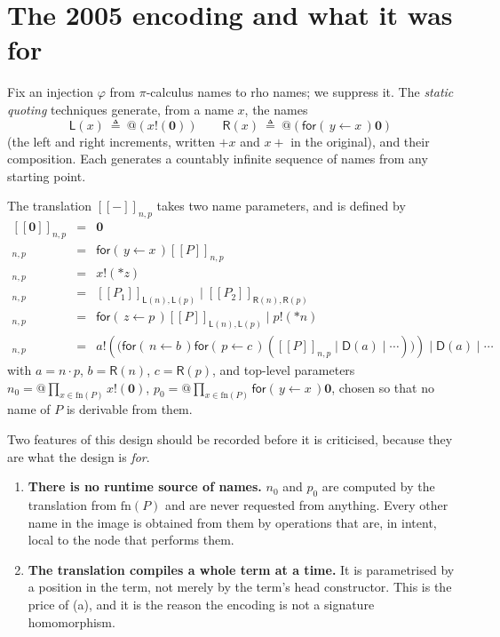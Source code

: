 \documentclass[11pt]{article}
\makeatletter
\theoremstyle{definition}
\theoremstyle{plain}
\theoremstyle{remark}
\newcommand{\quo}[1]{@#1}
\newcommand{\drp}[1]{{*}#1}
\newcommand{\inp}[3]{\mathsf{for}(\,#1 \leftarrow #2\,)#3}
\newcommand{\out}[2]{#1!(#2)}
\newcommand{\enc}[1]{[\![#1]\!]}
\newcommand{\nil}{\mathbf{0}}
\newcommand{\Lft}{\mathsf{L}}
\newcommand{\Rgt}{\mathsf{R}}
\newcommand{\Dup}{\mathsf{D}}
\newcommand{\fn}{\mathrm{fn}}
\makeatother
\begin{document}
\section{The 2005 encoding and what it was for}\label{sec:2005}

Fix an injection $\varphi$ from $\pi$-calculus names to rho names; we
suppress it. The \emph{static quoting} techniques generate, from a name
$x$, the names
\[
  \Lft(x) \ \triangleq\ \quo{(\out{x}{\nil})}
  \qquad
  \Rgt(x) \ \triangleq\ \quo{(\inp{y}{x}{\nil})}
\]
(the left and right increments, written $+x$ and $x{+}$ in the original),
and their composition. Each generates a countably infinite sequence of
names from any starting point.

The translation $\enc{-}_{n,p}$ takes two name parameters, and is defined
by
\[
\begin{array}{rcl}
\enc{\nil}_{n,p} &=& \nil \\
\enc{x(y).P}_{n,p} &=& \inp{y}{x}{\enc{P}_{n,p}} \\
\enc{\bar x \langle z\rangle}_{n,p} &=& \out{x}{\drp{z}} \\
\enc{P_1 \mid P_2}_{n,p} &=& \enc{P_1}_{\Lft(n),\Lft(p)} \mid \enc{P_2}_{\Rgt(n),\Rgt(p)} \\
\enc{(\nu z)P}_{n,p} &=& \inp{z}{p}{\enc{P}_{\Lft(n),\Lft(p)}} \mid \out{p}{\drp{n}} \\
\enc{!P}_{n,p} &=& \out{a}{\big(\inp{n}{b}{\inp{p}{c}{(\enc{P}_{n,p} \mid \Dup(a) \mid \cdots)}}\big)}
                   \mid \Dup(a) \mid \cdots
\end{array}
\]
with $a = n \cdot p$, $b = \Rgt(n)$, $c = \Rgt(p)$, and top-level
parameters $n_0 = \quo{\prod_{x \in \fn(P)} \out{x}{\nil}}$,
$p_0 = \quo{\prod_{x \in \fn(P)} \inp{y}{x}{\nil}}$, chosen so that no
name of $P$ is derivable from them.

Two features of this design should be recorded before it is criticised,
because they are what the design is \emph{for}.

\begin{enumerate}[label=(\alph*),leftmargin=2.2em]
\item \textbf{There is no runtime source of names.} $n_0$ and $p_0$ are
computed by the translation from $\fn(P)$ and are never requested from
anything. Every other name in the image is obtained from them by
operations that are, in intent, local to the node that performs them.
\item \textbf{The translation compiles a whole term at a time.} It is
parametrised by a position in the term, not merely by the term's head
constructor. This is the price of (a), and it is the reason the encoding
is not a signature homomorphism.
\end{enumerate}
\end{document}
